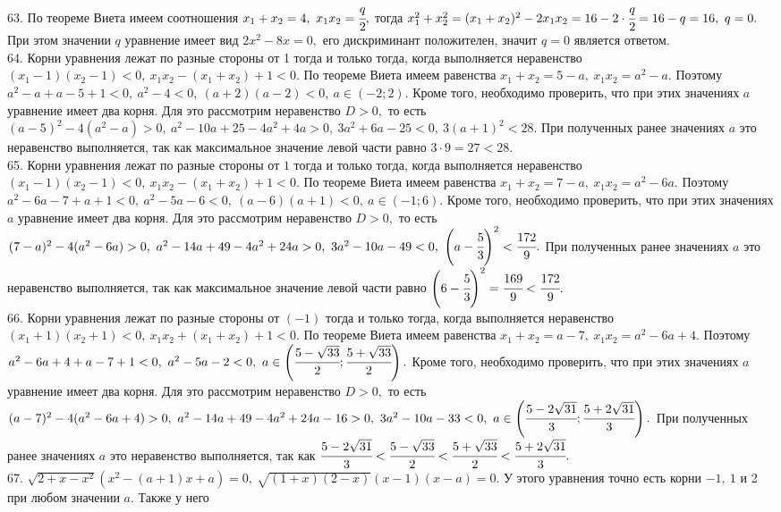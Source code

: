 63. По теореме Виета имеем соотношения $x_1+x_2=4,\ x_1x_2=\cfrac{q}{2},$ тогда $x_1^2+x_2^2=(x_1+x_2)^2-2x_1x_2=16-2\cdot\cfrac{q}{2}=16-q=16,\ q=0.$ При этом значении $q$ уравнение имеет вид $2x^2-8x=0,$ его дискриминант положителен, значит $q=0$ является ответом.\\
64. Корни уравнения лежат по разные стороны от 1 тогда и только тогда, когда выполняется неравенство $(x_1-1)(x_2-1)<0,\ x_1x_2-(x_1+x_2)+1<0.$ По теореме Виета имеем равенства $x_1+x_2=5-a,\ x_1x_2=a^2-a.$ Поэтому $a^2-a+a-5+1<0,\
a^2-4<0,\ (a+2)(a-2)<0,\ a\in(-2;2).$ Кроме того, необходимо проверить, что при этих значениях $a$ уравнение имеет два корня. Для это рассмотрим неравенство $D>0,$ то есть $(a-5)^2-4(a^2-a)>0,\ a^2-10a+25-4a^2+4a>0,\ 3a^2+6a-25<0,\ 3(a+1)^2<28.$ При полученных ранее значениях $a$ это неравенство выполняется, так как максимальное значение левой части равно $3\cdot9=27<28.$\\
65. Корни уравнения лежат по разные стороны от $1$ тогда и только тогда, когда выполняется неравенство $(x_1-1)(x_2-1)<0,\ x_1x_2-(x_1+x_2)+1<0.$ По теореме Виета имеем равенства $x_1+x_2=7-a,\ x_1x_2=a^2-6a.$ Поэтому $a^2-6a-7+a+1<0,\ a^2-5a-6<0,\ (a-6)(a+1)<0,\ a\in(-1;6).$ Кроме того, необходимо проверить, что при этих значениях $a$ уравнение имеет два корня. Для это рассмотрим неравенство $D>0,$ то есть $(7-a)^2-4(a^2-6a)>0,\ a^2-14a+49-4a^2+24a>0,\ 3a^2-10a-49<0,\ \left(a-\cfrac{5}{3}\right)^2<\cfrac{172}{9}.$ При полученных ранее значениях $a$ это неравенство выполняется, так как максимальное значение левой части равно $\left(6-\cfrac{5}{3}\right)^2=\cfrac{169}{9}<\cfrac{172}{9}.$\\
66. Корни уравнения лежат по разные стороны от $(-1)$ тогда и только тогда, когда выполняется неравенство $(x_1+1)(x_2+1)<0,\ x_1x_2+(x_1+x_2)+1<0.$ По теореме Виета имеем равенства $x_1+x_2=a-7,\ x_1x_2=a^2-6a+4.$ Поэтому $a^2-6a+4+a-7+1<0,\ a^2-5a-2<0,\ a\in\left(\cfrac{5-\sqrt{33}}{2};\cfrac{5+\sqrt{33}}{2}\right).$ Кроме того, необходимо проверить, что при этих значениях $a$ уравнение имеет два корня. Для это рассмотрим неравенство $D>0,$ то есть $(a-7)^2-4(a^2-6a+4)>0,\ a^2-14a+49-4a^2+24a-16>0,\ 3a^2-10a-33<0,\ a\in\left(\cfrac{5-2\sqrt{31}}{3};\cfrac{5+2\sqrt{31}}{3}\right).$ При полученных ранее значениях $a$ это неравенство выполняется, так как $\cfrac{5-2\sqrt{31}}{3}<\cfrac{5-\sqrt{33}}{2}<\cfrac{5+\sqrt{33}}{2}<\cfrac{5+2\sqrt{31}}{3}.$\\
67. $\sqrt{2+x-x^2}(x^2-(a+1)x+a)=0,\ \sqrt{(1+x)(2-x)}(x-1)(x-a)=0.$ У этого уравнения точно есть корни $-1,\ 1$ и 2 при любом значении $a.$ Также у него

